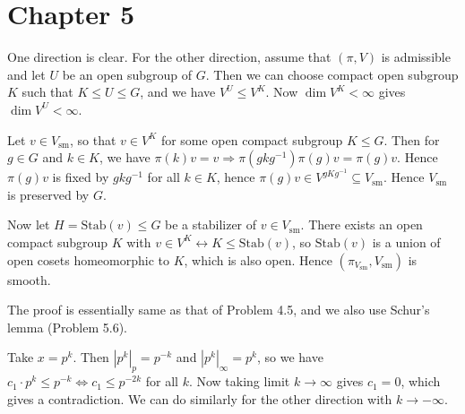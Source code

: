\newpage
\section{Chapter 5}

\begin{problem} \notfinish
\end{problem}

\begin{problem}
One direction is clear.
For the other direction, assume that $(\pi, V)$ is admissible and let $U$ be an open subgroup of $G$.
Then we can choose compact open subgroup $K$ such that $K\leq U \leq G$, and we have $V^U \leq V^K$.
Now $\dim V^K <\infty$ gives $\dim V^U <\infty$.
\end{problem}

\begin{problem}
Let $v \in V_{\mathrm{sm}}$, so that $v\in V^K$ for some open compact subgroup $K\leq G$.
Then for $g\in G$ and $k \in K$, we have $\pi(k)v = v \Rightarrow \pi(gkg^{-1})\pi(g)v = \pi(g)v$.
Hence $\pi(g)v$ is fixed by $gkg^{-1}$ for all $k\in K$, hence $\pi(g)v \in V^{gKg^{-1}}\subseteq V_\mathrm{sm}$.
Hence $V_{\mathrm{sm}}$ is preserved by $G$.

Now let $H = \mathrm{Stab}(v) \leq G$ be a stabilizer of $v\in V_{\mathrm{sm}}$.
There exists an open compact subgroup $K$ with $v \in V^K \leftrightarrow K\leq \mathrm{Stab}(v)$,
so $\mathrm{Stab}(v)$ is a union of open cosets homeomorphic to $K$, which is also open.
Hence $(\pi_{V_\mathrm{sm}}, V_{\mathrm{sm}})$ is smooth.
\end{problem}

\begin{problem} \notfinish
\end{problem}

\begin{problem} \notfinish
\end{problem}

\begin{problem} \notfinish
\end{problem}

\begin{problem} \notfinish
\end{problem}

\begin{problem}
The proof is essentially same as that of Problem 4.5, and we also use Schur's lemma (Problem 5.6).
\end{problem}

\begin{problem}
Take $x = p^k$. Then $|p^k|_p = p^{-k}$ and $|p^{k}|_\infty = p^k$, so we have
$c_{1}\cdot p^{k} \leq p^{-k} \Leftrightarrow c_{1} \leq p^{-2k}$ for all $k$.
Now taking limit $k\to\infty$ gives $c_1 = 0$, which gives a contradiction.
We can do similarly for the other direction with $k\to-\infty$.
\end{problem}

